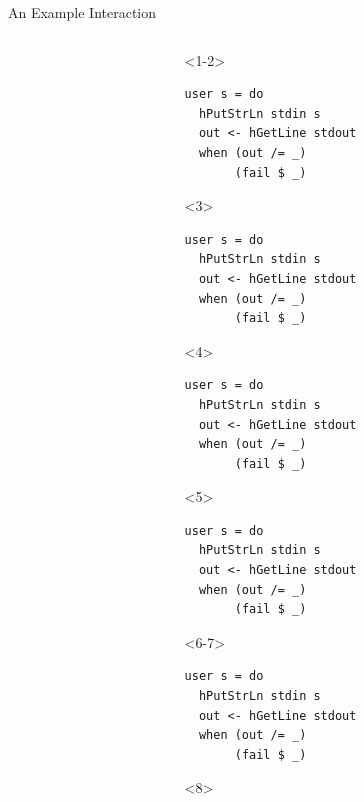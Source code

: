 \documentclass{beamer}
\begin{document}
\begin{frame}[fragile]{An Example Interaction}
\begin{columns}[t]
\begin{column}{0.5\textwidth}
    \end{column}
    \begin{column}{0.5\textwidth}
\begin{onlyenv}<1-2>
\begin{verbatim}
user s = do
  hPutStrLn stdin s
  out <- hGetLine stdout
  when (out /= _)
       (fail $ _)
\end{verbatim}
\end{onlyenv}
\begin{onlyenv}<3>
\begin{verbatim}
user s = do
  hPutStrLn stdin s
  out <- hGetLine stdout
  when (out /= _)
       (fail $ _)
\end{verbatim}
\end{onlyenv}
\begin{onlyenv}<4>
\begin{verbatim}
user s = do
  hPutStrLn stdin s
  out <- hGetLine stdout
  when (out /= _)
       (fail $ _)
\end{verbatim}
\end{onlyenv}
\begin{onlyenv}<5>
\begin{verbatim}
user s = do
  hPutStrLn stdin s
  out <- hGetLine stdout
  when (out /= _)
       (fail $ _)
\end{verbatim}
\end{onlyenv}
\begin{onlyenv}<6-7>
\begin{verbatim}
user s = do
  hPutStrLn stdin s
  out <- hGetLine stdout
  when (out /= _)
       (fail $ _)
\end{verbatim}
\end{onlyenv}
\begin{onlyenv}<8>
\begin{verbatim}

\end{verbatim}
\end{onlyenv}
\end{column}
\end{columns}
\end{frame}
\end{document}
